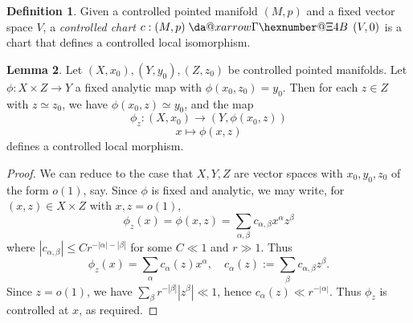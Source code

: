 \documentclass[reqno]{amsart}
\makeatletter
\newcommand*{\da@rightarrow}{\mathchar"0\hexnumber@\symAMSa 4B }
\newcommand*{\xdashrightarrow}[2][]{%
  \mathrel{%
    \mathpalette{\da@xarrow{#1}{#2}{}\da@rightarrow{\,}{}}{}%
  }%
}
\newcommand*{\da@xarrow}[7]{%
  \sbox0{$\ifx#7\scriptstyle\scriptscriptstyle\else\scriptstyle\fi#5#1#6\m@th$}%
  \sbox2{$\ifx#7\scriptstyle\scriptscriptstyle\else\scriptstyle\fi#5#2#6\m@th$}%
  \sbox4{$#7\dabar@\m@th$}%
  \dimen@=\wd0 %
  \ifdim\wd2 >\dimen@
    \dimen@=\wd2 %
  \fi
  \count@=2 %
  \def\da@bars{\dabar@\dabar@}%
  \@whiledim\count@\wd4<\dimen@\do{%
    \advance\count@\@ne
    \expandafter\def\expandafter\da@bars\expandafter{%
      \da@bars
      \dabar@ 
    }%
  }%
  \mathrel{#3}%
  \mathrel{%
    \mathop{\da@bars}\limits
    \ifx\\#1\\%
    \else
      _{\copy0}%
    \fi
    \ifx\\#2\\%
    \else
      ^{\copy2}%
    \fi
  }%
  \mathrel{#4}%
}
\theoremstyle{plain} \newtheorem{theorem} {Theorem}
\theoremstyle{definition} \newtheorem{definition} [theorem] {Definition}
\theoremstyle{itplain} %
\newtheorem{lemma}[theorem]{Lemma}
\numberwithin{equation}{section}
\numberwithin{theorem}{section}
\renewcommand{\leq}{\leqslant}
\makeatother
\begin{document}
\begin{definition}
  Given a controlled pointed manifold $(M,p)$ and a fixed vector space $V$, a \emph{controlled chart} $c : (M,p) \xdashrightarrow{} (V,0)$ is a chart that defines a controlled local isomorphism.
\end{definition}

\begin{lemma}\label{lem:families-controlled-maps}
Let $(X,x_0),(Y,y_0),(Z,z_0)$ be controlled pointed manifolds.  Let $\phi : X \times Z \rightarrow Y$ a fixed analytic map with $\phi(x_0,z_0) = y_0$.  Then for each $z \in Z$ with $z \simeq z_0$, we have $\phi(x_0,z) \simeq y_0$, and the map
\begin{equation*}
  \phi_z : (X,x_0) \rightarrow (Y,\phi(x_0,z))
\end{equation*}
\begin{equation*}
  x \mapsto \phi(x,z)
\end{equation*}
defines a controlled local morphism.
\end{lemma}
\begin{proof}
  We can reduce to the case that $X,Y,Z$ are vector spaces with $x_0,y_0,z_0$ of the form $o(1)$, say.  Since $\phi$ is fixed and analytic, we may write, for $(x,z) \in X \times Z$ with $x,z = o(1)$, 
  \begin{equation*}
    \phi_z(x) = \phi(x,z) = \sum_{\alpha,\beta} c_{\alpha,\beta} x^\alpha z^\beta
  \end{equation*}
  where $|c_{\alpha, \beta}| \leq C r^{-|\alpha| - |\beta|}$ for some $C \ll 1$ and $r \gg 1$.  Thus
  \begin{equation*}
    \phi_z(x) = \sum_{\alpha} c_\alpha(z) x^\alpha, \quad
    c_\alpha(z) := \sum_{\beta} c_{\alpha,\beta} z^\beta.
  \end{equation*}
  Since $z = o(1)$, we have $\sum_{\beta} r^{-|\beta|} |z^\beta| \ll 1$, hence $c_\alpha(z) \ll r^{-|\alpha|}$.  Thus $\phi_z$ is controlled at $x$, as required.
\end{proof}
\end{document}
